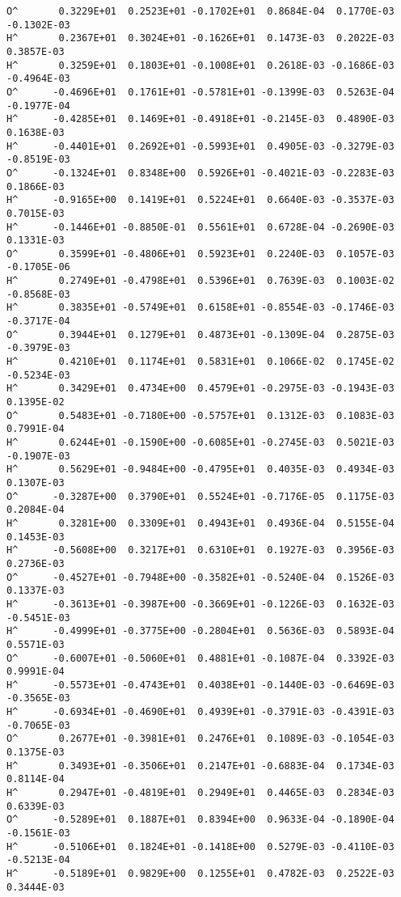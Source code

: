 \begin{verbatim}
O^       0.3229E+01  0.2523E+01 -0.1702E+01  0.8684E-04  0.1770E-03 -0.1302E-03
H^       0.2367E+01  0.3024E+01 -0.1626E+01  0.1473E-03  0.2022E-03  0.3857E-03
H^       0.3259E+01  0.1803E+01 -0.1008E+01  0.2618E-03 -0.1686E-03 -0.4964E-03
O^      -0.4696E+01  0.1761E+01 -0.5781E+01 -0.1399E-03  0.5263E-04 -0.1977E-04
H^      -0.4285E+01  0.1469E+01 -0.4918E+01 -0.2145E-03  0.4890E-03  0.1638E-03
H^      -0.4401E+01  0.2692E+01 -0.5993E+01  0.4905E-03 -0.3279E-03 -0.8519E-03
O^      -0.1324E+01  0.8348E+00  0.5926E+01 -0.4021E-03 -0.2283E-03  0.1866E-03
H^      -0.9165E+00  0.1419E+01  0.5224E+01  0.6640E-03 -0.3537E-03  0.7015E-03
H^      -0.1446E+01 -0.8850E-01  0.5561E+01  0.6728E-04 -0.2690E-03  0.1331E-03
O^       0.3599E+01 -0.4806E+01  0.5923E+01  0.2240E-03  0.1057E-03 -0.1705E-06
H^       0.2749E+01 -0.4798E+01  0.5396E+01  0.7639E-03  0.1003E-02 -0.8568E-03
H^       0.3835E+01 -0.5749E+01  0.6158E+01 -0.8554E-03 -0.1746E-03 -0.3717E-04
O^       0.3944E+01  0.1279E+01  0.4873E+01 -0.1309E-04  0.2875E-03 -0.3979E-03
H^       0.4210E+01  0.1174E+01  0.5831E+01  0.1066E-02  0.1745E-02 -0.5234E-03
H^       0.3429E+01  0.4734E+00  0.4579E+01 -0.2975E-03 -0.1943E-03  0.1395E-02
O^       0.5483E+01 -0.7180E+00 -0.5757E+01  0.1312E-03  0.1083E-03  0.7991E-04
H^       0.6244E+01 -0.1590E+00 -0.6085E+01 -0.2745E-03  0.5021E-03 -0.1907E-03
H^       0.5629E+01 -0.9484E+00 -0.4795E+01  0.4035E-03  0.4934E-03  0.1307E-03
O^      -0.3287E+00  0.3790E+01  0.5524E+01 -0.7176E-05  0.1175E-03  0.2084E-04
H^       0.3281E+00  0.3309E+01  0.4943E+01  0.4936E-04  0.5155E-04  0.1453E-03
H^      -0.5608E+00  0.3217E+01  0.6310E+01  0.1927E-03  0.3956E-03  0.2736E-03
O^      -0.4527E+01 -0.7948E+00 -0.3582E+01 -0.5240E-04  0.1526E-03  0.1337E-03
H^      -0.3613E+01 -0.3987E+00 -0.3669E+01 -0.1226E-03  0.1632E-03 -0.5451E-03
H^      -0.4999E+01 -0.3775E+00 -0.2804E+01  0.5636E-03  0.5893E-04  0.5571E-03
O^      -0.6007E+01 -0.5060E+01  0.4881E+01 -0.1087E-04  0.3392E-03  0.9991E-04
H^      -0.5573E+01 -0.4743E+01  0.4038E+01 -0.1440E-03 -0.6469E-03 -0.3565E-03
H^      -0.6934E+01 -0.4690E+01  0.4939E+01 -0.3791E-03 -0.4391E-03 -0.7065E-03
O^       0.2677E+01 -0.3981E+01  0.2476E+01  0.1089E-03 -0.1054E-03  0.1375E-03
H^       0.3493E+01 -0.3506E+01  0.2147E+01 -0.6883E-04  0.1734E-03  0.8114E-04
H^       0.2947E+01 -0.4819E+01  0.2949E+01  0.4465E-03  0.2834E-03  0.6339E-03
O^      -0.5289E+01  0.1887E+01  0.8394E+00  0.9633E-04 -0.1890E-04 -0.1561E-03
H^      -0.5106E+01  0.1824E+01 -0.1418E+00  0.5279E-03 -0.4110E-03 -0.5213E-04
H^      -0.5189E+01  0.9829E+00  0.1255E+01  0.4782E-03  0.2522E-03  0.3444E-03

\end{verbatim}
